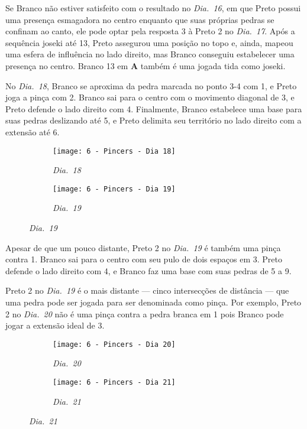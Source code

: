 Se Branco não estiver satisfeito com o resultado no \emph{Dia.\@~16}, em que Preto possui uma presença esmagadora no centro enquanto que suas próprias pedras se confinam ao canto, ele pode optar pela resposta 3 à Preto 2 no \emph{Dia.\@~17}. Após a sequência joseki até 13, Preto assegurou uma posição no topo e, ainda, mapeou uma esfera de influência no lado direito, mas Branco conseguiu estabelecer uma presença no centro. Branco 13 em \textbf{A} também é uma jogada tida como joseki.

No \emph{Dia.\@~18}, Branco se aproxima da pedra marcada no ponto 3-4 com 1, e Preto joga a pinça com 2. Branco sai para o centro com o movimento diagonal de 3, e Preto defende o lado direito com 4. Finalmente, Branco estabelece uma base para suas pedras deslizando até 5, e Preto delimita seu território no lado direito com a extensão até 6.

\begin{figure}[h!]
    \centering
    \begin{subfigure}[t]{.3\textwidth}
        \centering
        \texttt{[image: 6 - Pincers - Dia 18]}
        \captionsetup{justification=centering}
        \caption*{\emph{Dia.\@~18}}
    \end{subfigure}
    \hspace{1cm}
    \begin{subfigure}[t]{.3\textwidth}
        \centering
        \texttt{[image: 6 - Pincers - Dia 19]}
        \captionsetup{justification=centering}
        \caption*{\emph{Dia.\@~19}}
    \end{subfigure}
\end{figure}

Apesar de que um pouco distante, Preto 2 no \emph{Dia.\@~19} é também uma pinça contra 1. Branco sai para o centro com seu pulo de dois espaços em 3. Preto defende o lado direito com 4, e Branco faz uma base com suas pedras de 5 a 9.

\pagebreak

Preto 2 no \emph{Dia.\@~19} é o mais distante --- cinco intersecções de distância --- que uma pedra pode ser jogada para ser denominada como pinça. Por exemplo, Preto 2 no \emph{Dia.\@~20} não é uma pinça contra a pedra branca em 1 pois Branco pode jogar a extensão ideal de 3.

\begin{figure}[h!]
    \centering
    \begin{subfigure}[t]{.3\textwidth}
        \centering
        \texttt{[image: 6 - Pincers - Dia 20]}
        \captionsetup{justification=centering}
        \caption*{\emph{Dia.\@~20}}
    \end{subfigure}
    \hspace{1cm}
    \begin{subfigure}[t]{.3\textwidth}
        \centering
        \texttt{[image: 6 - Pincers - Dia 21]}
        \captionsetup{justification=centering}
        \caption*{\emph{Dia.\@~21}}
    \end{subfigure}
\end{figure}

